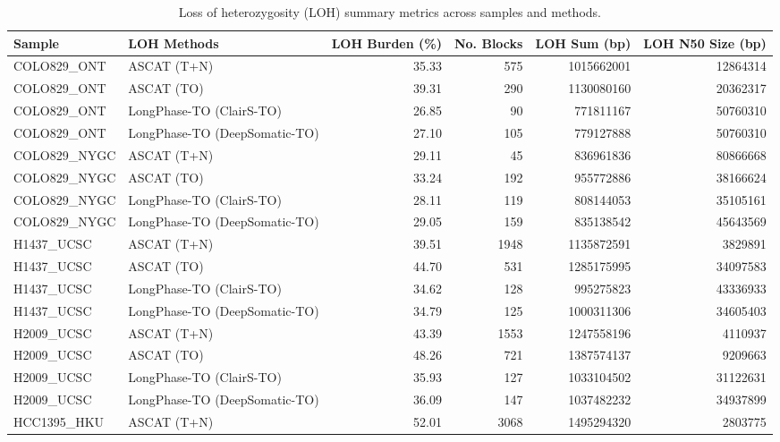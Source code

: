 \documentclass[pdflatex,sn-nature]{sn-jnl}
\begin{document}
\begin{table}[htbp]
  \centering
  \caption{Loss of heterozygosity (LOH) summary metrics across samples and methods.}
  \label{tab:loh_summary}
  \begin{tabular}{llrrrr}
    \toprule
    Sample & LOH Methods & LOH Burden (\%) & No. Blocks & LOH Sum (bp) & LOH N50 Size (bp) \\
    \midrule
    COLO829\_ONT   & ASCAT (T+N)                  & 35.33 & 575  & 1015662001 & 12864314  \\
    COLO829\_ONT   & ASCAT (TO)                   & 39.31 & 290  & 1130080160 & 20362317  \\
    COLO829\_ONT   & LongPhase-TO (ClairS-TO)      & 26.85 &  90  &  771811167 & 50760310  \\
    COLO829\_ONT   & LongPhase-TO (DeepSomatic-TO) & 27.10 & 105  &  779127888 & 50760310  \\
    COLO829\_NYGC  & ASCAT (T+N)                  & 29.11 &  45  &  836961836 & 80866668  \\
    COLO829\_NYGC  & ASCAT (TO)                   & 33.24 & 192  &  955772886 & 38166624  \\
    COLO829\_NYGC  & LongPhase-TO (ClairS-TO)      & 28.11 & 119  &  808144053 & 35105161  \\
    COLO829\_NYGC  & LongPhase-TO (DeepSomatic-TO) & 29.05 & 159  &  835138542 & 45643569 \\
    H1437\_UCSC    & ASCAT (T+N)                  & 39.51 & 1948 & 1135872591 &  3829891  \\
    H1437\_UCSC    & ASCAT (TO)                   & 44.70 & 531  & 1285175995 & 34097583  \\
    H1437\_UCSC    & LongPhase-TO (ClairS-TO)      & 34.62 & 128  &  995275823 & 43336933  \\
    H1437\_UCSC    & LongPhase-TO (DeepSomatic-TO) & 34.79 & 125  & 1000311306 & 34605403  \\
    H2009\_UCSC    & ASCAT (T+N)                  & 43.39 & 1553 & 1247558196 &  4110937  \\
    H2009\_UCSC    & ASCAT (TO)                   & 48.26 & 721  & 1387574137 &  9209663  \\
    H2009\_UCSC    & LongPhase-TO (ClairS-TO)      & 35.93 & 127  & 1033104502 & 31122631  \\
    H2009\_UCSC    & LongPhase-TO (DeepSomatic-TO) & 36.09 & 147  & 1037482232 & 34937899  \\
    HCC1395\_HKU   & ASCAT (T+N)                  & 52.01 & 3068 & 1495294320 &  2803775  \\

\end{tabular}
\end{table}
\end{document}
